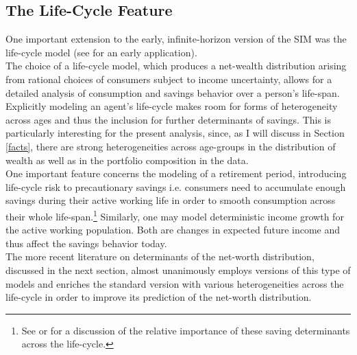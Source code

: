 \documentclass[a4paper,12pt,legno]{article}
\begin{document}
\subsection{The Life-Cycle Feature}
One important extension to the early, infinite-horizon version of the SIM was the life-cycle model (see \cite{huggett1996wealth} for an early application).\\
The choice of a life-cycle model, which produces a net-wealth distribution arising from rational choices of consumers subject to income uncertainty, allows for a detailed analysis of consumption and savings behavior over a person's life-span. 
Explicitly modeling an agent's life-cycle makes room for forms of heterogeneity across ages and thus the inclusion for further determinants of savings. This is particularly interesting for the present analysis, since, as I will discuss in Section \ref{facts}, there are strong heterogeneities across age-groups in the distribution of wealth as well as in the portfolio composition in the data.\\
One important feature concerns the modeling of a retirement period, introducing life-cycle risk to precautionary savings i.e. consumers need to accumulate enough savings during their active working life in order to smooth consumption across their whole life-span.\footnote{See \cite{cagetti2003} or \cite{Gourinchas&Parker2002} for a discussion of the relative importance of these saving determinants across the life-cycle.} Similarly, one may model deterministic income growth for the active working population. Both are changes in expected future income and thus affect the savings behavior today. 
\\
The more recent literature on determinants of the net-worth distribution, discussed in the next section, almost unanimously employs versions of this type of models and enriches the standard version with various heterogeneities across the life-cycle in order to improve its prediction of the net-worth distribution.
\end{document}
